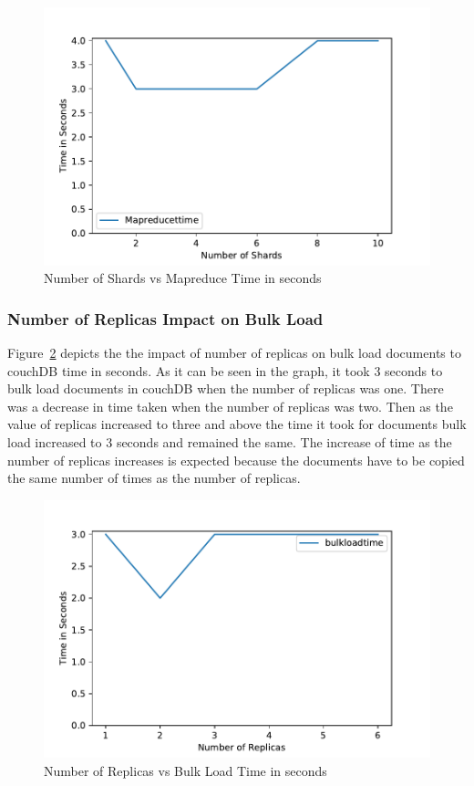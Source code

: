 \begin{figure}[!ht]
  \centering\includegraphics[width=\columnwidth]{../images/ShardsMapReduce.pdf}
  \caption{Number of Shards vs Mapreduce Time in seconds }\label{f:shard-mapreduce}
\end{figure}

\subsubsection{Number of Replicas Impact on Bulk Load}


Figure~\ref{f:replica-bulk} depicts the the impact of number of replicas
on bulk load documents to couchDB time in seconds. As it can be seen
in the graph, it took 3 seconds to bulk load documents in couchDB when
the number of replicas was one. There was a decrease in time
taken when the number of replicas was two. Then as the value of
replicas increased to three and above the time it took for documents
bulk load increased to 3 seconds and remained the same. The increase
of time as the number of replicas increases is expected because the
documents have to be copied the same number of times as the number of
replicas. 


\begin{figure}[!ht]
  \centering\includegraphics[width=\columnwidth]{../images/ReplicasBulkLoad.pdf}
  \caption{Number of Replicas vs Bulk Load Time in seconds }\label{f:replica-bulk}
\end{figure}

